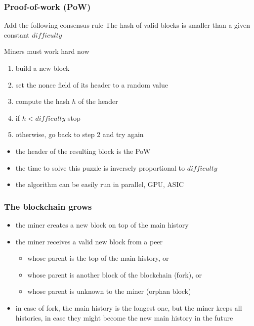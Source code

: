 \documentclass[11pt]{beamer}  %
\begin{document}
\begin{frame}\frametitle{Proof-of-work (PoW)}

  \begin{greenbox}{Add the following consensus rule}
    The hash of valid blocks is smaller than
    a given constant $\mathit{difficulty}$
  \end{greenbox}

  \bigskip

  \begin{greenbox}{Miners must work hard now}
    \begin{enumerate}
    \item build a new block
    \item set the nonce field of its header to a random value
    \item compute the hash $h$ of the header
    \item if $h < \mathit{difficulty}$ stop
    \item otherwise, go back to step 2 and try again
    \end{enumerate}
  \end{greenbox}

  \bigskip

  \begin{itemize}
  \item the header of the resulting block is the PoW
  \item the time to solve this puzzle is inversely proportional to $\mathit{difficulty}$
  \item the algorithm can be easily run in parallel, GPU, ASIC
  \end{itemize}

\end{frame}

\begin{frame}\frametitle{The blockchain grows}

  \begin{itemize}
  \item the miner creates a new block on top of the main history
  \item the miner receives a valid new block from a peer
    \begin{itemize}
    \item whose parent is the top of the main history, or
    \item whose parent is another block of the blockchain (fork), or
    \item whose parent is unknown to the miner (orphan block)
    \end{itemize}
  \item in case of fork, the main history is the longest one, but the miner keeps all histories,
    in case they might become the new main history in the future
  \end{itemize}
  
\end{frame}
\end{document}
